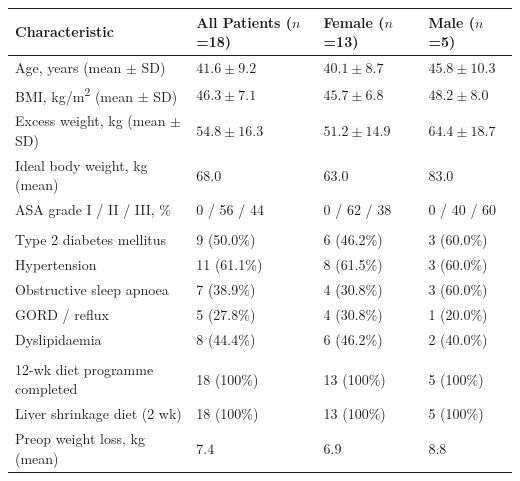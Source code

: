 \documentclass[11pt,a4paper]{article}
\begin{document}
\begin{center}
\small
\setlength{\tabcolsep}{7pt}
\renewcommand{\arraystretch}{1.35}
\begin{tabularx}{\textwidth}{L{5.4cm} C{3.2cm} C{3.2cm} C{3.2cm}}
  \color{white}\bfseries Characteristic &
  \color{white}\bfseries All Patients ($n$=18) &
  \color{white}\bfseries Female ($n$=13) &
  \color{white}\bfseries Male ($n$=5) \\
  \midrule
  Age, years (mean $\pm$ SD) & $41.6 \pm 9.2$ & $40.1 \pm 8.7$ & $45.8 \pm 10.3$ \\
  BMI, kg/m\textsuperscript{2} (mean $\pm$ SD) & $46.3 \pm 7.1$ & $45.7 \pm 6.8$ & $48.2 \pm 8.0$ \\
  Excess weight, kg (mean $\pm$ SD) & $54.8 \pm 16.3$ & $51.2 \pm 14.9$ & $64.4 \pm 18.7$ \\
  Ideal body weight, kg (mean) & $68.0$ & $63.0$ & $83.0$ \\
  ASA grade I / II / III, \% & 0 / 56 / 44 & 0 / 62 / 38 & 0 / 40 / 60 \\
  \midrule
  \\
  Type 2 diabetes mellitus & 9 (50.0\%) & 6 (46.2\%) & 3 (60.0\%) \\
  Hypertension & 11 (61.1\%) & 8 (61.5\%) & 3 (60.0\%) \\
  Obstructive sleep apnoea & 7 (38.9\%) & 4 (30.8\%) & 3 (60.0\%) \\
  GORD / reflux & 5 (27.8\%) & 4 (30.8\%) & 1 (20.0\%) \\
  Dyslipidaemia & 8 (44.4\%) & 6 (46.2\%) & 2 (40.0\%) \\
  \midrule
  \\
  12-wk diet programme completed & 18 (100\%) & 13 (100\%) & 5 (100\%) \\
  Liver shrinkage diet (2 wk) & 18 (100\%) & 13 (100\%) & 5 (100\%) \\
  Preop weight loss, kg (mean) & $7.4$ & $6.9$ & $8.8$ \\
  \bottomrule
\end{tabularx}
\end{center}

\vspace{4pt}
\end{document}
